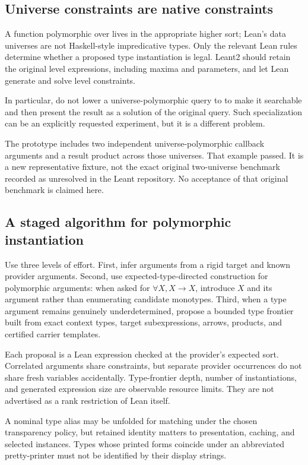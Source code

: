 \documentclass[11pt,letterpaper]{article}
\newcommand{\code}[1]{\texttt{\detokenize{#1}}}
\theoremstyle{definition}\newtheorem{definition}[theorem]{Definition}
\theoremstyle{remark}\newtheorem{remark}[theorem]{Remark}
\begin{document}
\subsection{Universe constraints are native constraints}

A function polymorphic over \code{Type u} lives in the appropriate higher sort;
Lean's data universes are not Haskell-style impredicative types. Only the relevant
Lean rules determine whether a proposed type instantiation is legal. Leant2
should retain the original level expressions, including maxima and parameters,
and let Lean generate and solve level constraints.\cite{leanmanual,propositions}

In particular, do not lower a universe-polymorphic query to \code{Type 0} to make
it searchable and then present the result as a solution of the original query.
Such specialization can be an explicitly requested experiment, but it is a
different problem.

The prototype includes two independent universe-polymorphic callback arguments
and a result product across those universes. That example passed. It is a new
representative fixture, not the exact original two-universe benchmark recorded
as unresolved in the Leant repository. No acceptance of that original benchmark
is claimed here.\cite{indexing}

\subsection{A staged algorithm for polymorphic instantiation}

Use three levels of effort. First, infer arguments from a rigid target and known
provider arguments. Second, use expected-type-directed construction for
polymorphic arguments: when asked for $\forall X, X\to X$, introduce $X$ and its
argument rather than enumerating candidate monotypes. Third, when a type argument
remains genuinely underdetermined, propose a bounded type frontier built from
exact context types, target subexpressions, arrows, products, and certified
carrier templates.

Each proposal is a Lean expression checked at the provider's expected sort.
Correlated arguments share constraints, but separate provider occurrences do not
share fresh variables accidentally. Type-frontier depth, number of instantiations,
and generated expression size are observable resource limits. They are not
advertised as a rank restriction of Lean itself.

A nominal type alias may be unfolded for matching under the chosen transparency
policy, but retained identity matters to presentation, caching, and selected
instances. Types whose printed forms coincide under an abbreviated pretty-printer
must not be identified by their display strings.
\end{document}
